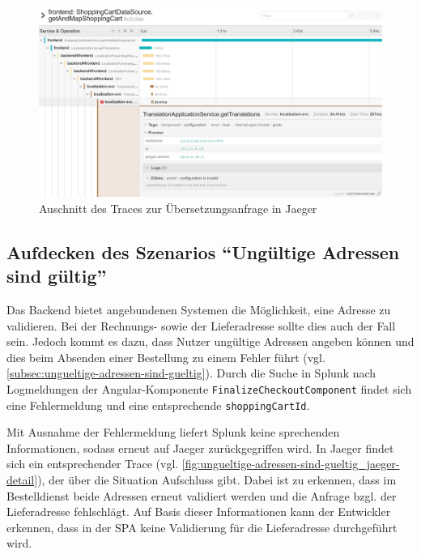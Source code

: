 \begin{figure}[H]
	\centering
	\includegraphics[width=1.00\linewidth]{img/05_ergebnis/keine-uebersetzungen_jaeger_detail.png}
	\caption{Auschnitt des Traces zur Übersetzungsanfrage in Jaeger}
	\label{fig:keine-uebersetzungen_jaeger_detail}
\end{figure}

\subsection{Aufdecken des Szenarios \enquote{Ungültige Adressen sind gültig}}

Das Backend bietet angebundenen Systemen die Möglichkeit, eine Adresse zu validieren. Bei der Rechnungs- sowie der Lieferadresse sollte dies auch der Fall sein. Jedoch kommt es dazu, dass Nutzer ungültige Adressen angeben können und dies beim Absenden einer Bestellung zu einem Fehler führt (vgl. \autoref{subsec:ungueltige-adressen-sind-gueltig}). Durch die Suche in Splunk nach Logmeldungen der Angular-Komponente \texttt{Finalize\-Checkout\-Component} findet sich eine Fehlermeldung und eine entsprechende \texttt{shopping\-Cart\-Id}.

Mit Ausnahme der Fehlermeldung liefert Splunk keine sprechenden Informationen, sodass erneut auf Jaeger zurückgegriffen wird. In Jaeger findet sich ein entsprechender Trace (vgl. \autoref{fig:ungueltige-adressen-sind-gueltig_jaeger-detail}), der über die Situation Aufschluss gibt. Dabei ist zu erkennen, dass im Bestelldienst beide Adressen erneut validiert werden und die Anfrage bzgl. der Lieferadresse fehlschlägt. Auf Basis dieser Informationen kann der Entwickler erkennen, dass in der SPA keine Validierung für die Lieferadresse durchgeführt wird.


